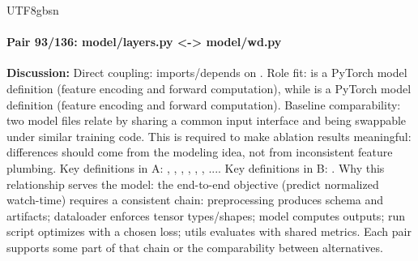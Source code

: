\documentclass[11pt]{article}
\begin{document}
\begin{CJK*}{UTF8}{gbsn}
\paragraph{Pair 93/136: model/layers.py <-> model/wd.py}
\textbf{Discussion:} Direct coupling: \texttt{} imports/depends on \texttt{}. Role fit: \texttt{} is a PyTorch model definition (feature encoding and forward computation), while \texttt{} is a PyTorch model definition (feature encoding and forward computation). Baseline comparability: two model files relate by sharing a common input interface and being swappable under similar training code. This is required to make ablation results meaningful: differences should come from the modeling idea, not from inconsistent feature plumbing. Key definitions in A: \texttt{}, \texttt{}, \texttt{}, \texttt{}, \texttt{}, \texttt{}, .... Key definitions in B: \texttt{}. Why this relationship serves the model: the end-to-end objective (predict normalized watch-time) requires a consistent chain: preprocessing produces schema and artifacts; dataloader enforces tensor types/shapes; model computes outputs; run script optimizes with a chosen loss; utils evaluates with shared metrics. Each pair supports some part of that chain or the comparability between alternatives.


\end{CJK*}
\end{document}
